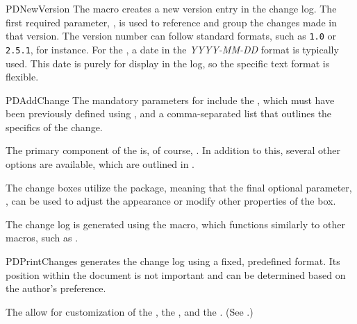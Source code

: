\documentclass[11pt]{article}
\begin{document}
\begin{Macrodef}{PDNewVersion}{}{}
    The  macro creates a new version entry in the change log. The first required parameter, , is used to reference and group the changes made in that version. The version number can follow standard formats, such as \texttt{1.0} or \texttt{2.5.1}, for instance. For the , a date in the \textit{YYYY-MM-DD} format is typically used. This date is purely for display in the log, so the specific text format is flexible.
\end{Macrodef}

\begin{PDListing}
\end{PDListing}

\begin{Macrodef}{PDAddChange}{}{}
    The mandatory parameters for  include the , which must have been previously defined using , and a comma-separated  list that outlines the specifics of the change.

    The primary component of the  is, of course, . In addition to this, several other options are available, which are outlined in .

    The change boxes utilize the  package, meaning that the final optional parameter, , can be used to adjust the appearance or modify other properties of the box.
\end{Macrodef}

\begin{PDListing}
\end{PDListing}

The change log is generated using the  macro, which functions similarly to other macros, such as .

\begin{Macrodef}{PDPrintChanges}{}{}
     generates the change log using a fixed, predefined format. Its position within the document is not important and can be determined based on the author's preference.

    The  allow for customization of the , the , and the . (See .)
\end{Macrodef}
\end{document}
